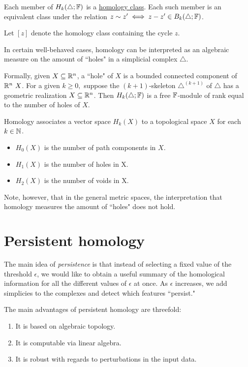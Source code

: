 \begin{defn}
Each member of $H_k(\triangle;\mathbb{F})$ is a \underline{homology class}. Each such member is an equivalent class under the relation $z\sim z^\prime \iff z -z^\prime \in B_k(\triangle;\mathbb{F})$. 

Let $[z]$ denote the homology class containing the cycle $z$. 
\end{defn}

\begin{defn}
In certain well-behaved cases, homology can be interpreted as an algebraic measure on the amount of ``holes" in a simplicial complex $\triangle$.

Formally, given $X\subseteq \mathbb R^n$, a ``hole" of $X$ is a bounded connected component of $\RR^n\ X$. For a given $k\geq 0,$ suppose the $(k+1)$-skeleton $\triangle^{(k+1)}$ of $\triangle$ has a geometric realization $X \subseteq \mathbb R^n$. Then $H_k(\triangle;\mathbb{F})$ is a free $\mathbb{F}$-module of rank equal to the number of holes of $X$. 

Homology associates a vector space $H_k(X)$ to a topological space $X$ for each $k\in \mathbb N$.
\begin{itemize}
    \item $H_0(X)$ is the number of path components in $X$.
    \item $H_1(X)$ is the number of holes in X.
    \item $H_2(X)$ is the number of voids in X.
\end{itemize}
\begin{rmk}
Note, however, that in the general metric spaces, the interpretation that homology measures the amount of ``holes" does not hold.
\end{rmk}
\end{defn}

\section{Persistent homology}

The main idea of \textit{persistence} is that instead of selecting a fixed value of the threshold $\epsilon$, we would like to obtain a useful summary of the homological information for all the different values of $\epsilon$ at once. As $\epsilon$ increases, we add simplicies to the complexes and detect which features ``persist."

The main advantages of persistent homology are threefold: 
\begin{enumerate}
    \item It is based on algebraic topology.
    \item It is computable via linear algebra.
    \item It is robust with regards to perturbations in the input data. 
\end{enumerate}

